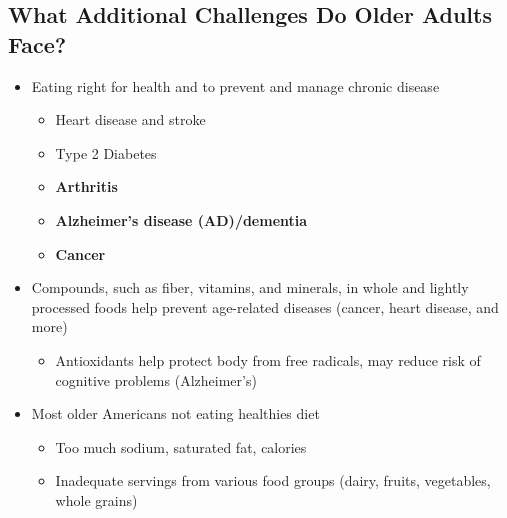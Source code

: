 \documentclass[12pt]{article}
\begin{document}
        \subsection{What Additional Challenges Do Older Adults Face?}
            \begin{itemize}
                \item Eating right for health and to prevent and manage chronic disease
                    \begin{itemize}
                        \item Heart disease and stroke
                        \item Type 2 Diabetes
                        \item \textbf{Arthritis}
                        \item \textbf{Alzheimer's disease (AD)/dementia}
                        \item \textbf{Cancer}
                    \end{itemize}
                \item Compounds, such as fiber, vitamins, and minerals, in whole and lightly processed foods help prevent age-related diseases (cancer, heart disease, and more)
                    \begin{itemize}
                        \item Antioxidants help protect body from free radicals, may reduce risk of cognitive problems (Alzheimer's)
                    \end{itemize}
                \item Most older Americans not eating healthies diet
                    \begin{itemize}
                        \item Too much sodium, saturated fat, calories
                        \item Inadequate servings from various food groups (dairy, fruits, vegetables, whole grains)
                    \end{itemize}
            \end{itemize}
\end{document}
